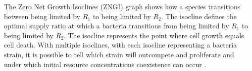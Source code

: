 The Zero Net Growth Isoclines (ZNGI) graph shows how a species transitions between being limited by $R_1$ to being limited by $R_2$. 
The isocline defines the optimal supply ratio at which a bacteria transitions from being limited by $R_1$ to being limited by $R_2$. 
The isocline represents the point where cell growth equals cell death. 
With multiple isoclines, with each isocline representing a bacteria strain, it is possible to tell which strain will outcompete and proliferate and under which initial resource concentrations coexistence can occur \cite{smithEffectsResourceSupplies2002}.